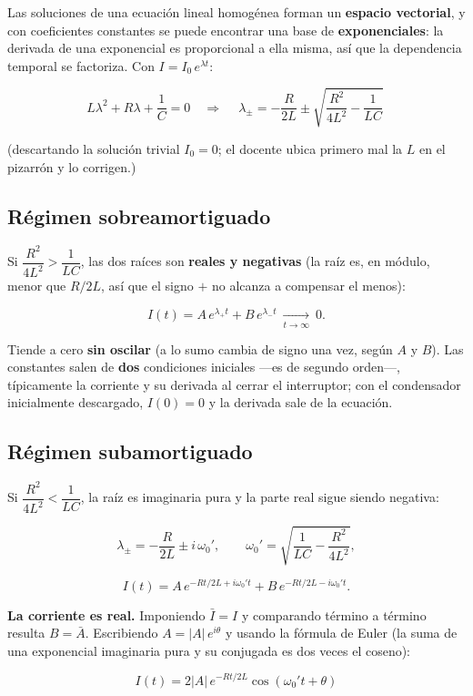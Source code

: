\documentclass[12pt,a4paper]{article}
\begin{document}
Las soluciones de una ecuación lineal homogénea forman un \textbf{espacio vectorial},
y con coeficientes constantes se puede encontrar una base de \textbf{exponenciales}:
la derivada de una exponencial es proporcional a ella misma, así que la
dependencia temporal se factoriza. Con $I = I_0\,e^{\lambda t}$:

\[
L\lambda^2 + R\lambda + \frac1C = 0
\quad\Longrightarrow\quad
\boxed{\ \lambda_\pm = -\frac{R}{2L} \pm\sqrt{\frac{R^2}{4L^2}-\frac{1}{LC}}\ }
\]

(descartando la solución trivial $I_0 = 0$; el docente ubica primero mal la
$L$ en el pizarrón y lo corrigen.)

\subsection{Régimen sobreamortiguado}

Si $\dfrac{R^2}{4L^2} > \dfrac{1}{LC}$, las dos raíces son \textbf{reales y
negativas} (la raíz es, en módulo, menor que $R/2L$, así que el signo $+$ no
alcanza a compensar el menos):

\[
I(t) = A\,e^{\lambda_+ t} + B\,e^{\lambda_- t}\ \xrightarrow[t\to\infty]{}\ 0 .
\]

Tiende a cero \textbf{sin oscilar} (a lo sumo cambia de signo una vez, según $A$ y
$B$). Las constantes salen de \textbf{dos} condiciones iniciales ---es de segundo
orden---, típicamente la corriente y su derivada al cerrar el interruptor; con el
condensador inicialmente descargado, $I(0) = 0$ y la derivada sale de la
ecuación.

\subsection{Régimen subamortiguado}

Si $\dfrac{R^2}{4L^2} < \dfrac{1}{LC}$, la raíz es imaginaria pura y la parte
real sigue siendo negativa:

\[
\lambda_\pm = -\frac{R}{2L} \pm i\,\omega_0',
\qquad
\omega_0' = \sqrt{\frac{1}{LC}-\frac{R^2}{4L^2}},
\]

\[
I(t) = A\,e^{-Rt/2L + i\omega_0' t} + B\,e^{-Rt/2L - i\omega_0' t}.
\]

\textbf{La corriente es real.} Imponiendo $\bar I = I$ y comparando término a
término resulta $B = \bar A$. Escribiendo $A = |A|\,e^{i\theta}$ y usando la
fórmula de Euler (la suma de una exponencial imaginaria pura y su conjugada es
dos veces el coseno):

\begin{keybox}
\[
\boxed{\ I(t) = 2|A|\,e^{-Rt/2L}\cos\!\left(\omega_0' t + \theta\right)\ }
\]
\end{keybox}
\end{document}
